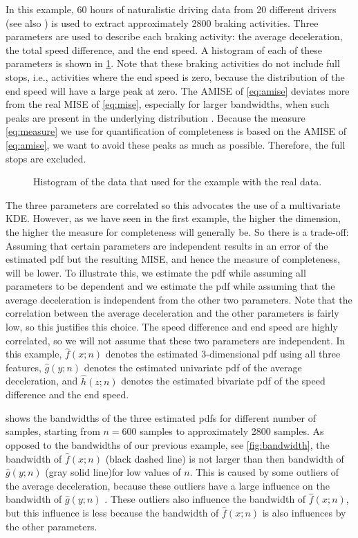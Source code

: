 In this example, 60 hours of naturalistic driving data from 20 different drivers (see also \textcite{deGelder2017assessment}) is used to extract approximately 2800 braking activities. Three parameters are used to describe each braking activity: the average deceleration, the total speed difference, and the end speed. A histogram of each of these parameters is shown in \cref{fig:histogram}. Note that these braking activities do not include full stops, i.e., activities where the end speed is zero, because the distribution of the end speed will have a large peak at zero. The AMISE of \cref{eq:amise} deviates more from the real MISE of \cref{eq:mise}, especially for larger bandwidths, when such peaks are present in the underlying distribution \cite{marron1992exact}. Because the measure \cref{eq:measure} we use for quantification of completeness is based on the AMISE of \cref{eq:amise}, we want to avoid these peaks as much as possible. Therefore, the full stops are excluded.

\setlength\figurewidth{\linewidth}
\setlength{}
\begin{figure}
	\centering
	
	\caption{Histogram of the data that used for the example with the real data.}
	\label{fig:histogram}
\end{figure}

The three parameters are correlated so this advocates the use of a multivariate KDE. However, as we have seen in the first example, the higher the dimension, the higher the measure for completeness will generally be. So there is a trade-off: Assuming that certain parameters are independent results in an error of the estimated pdf but the resulting MISE, and hence the measure of completeness, will be lower. To illustrate this, we estimate the pdf while assuming all parameters to be dependent and we estimate the pdf while assuming that the average deceleration is independent from the other two parameters. Note that the correlation between the average deceleration and the other parameters is fairly low, so this justifies this choice. The speed difference and end speed are highly correlated, so we will not assume that these two parameters are independent. In this example, $\hat{f}(x;n)$ denotes the estimated 3-dimensional pdf using all three features, $\hat{g}(y;n)$ denotes the estimated univariate pdf of the average deceleration, and $\hat{h}(z;n)$ denotes the estimated bivariate pdf of the speed difference and the end speed. 

 shows the bandwidths of the three estimated pdfs for different number of samples, starting from $n=600$ samples to approximately 2800 samples. As opposed to the bandwidths of our previous example, see \cref{fig:bandwidth}, the bandwidth of $\hat{f}(x;n)$ (black dashed line) is not larger than then bandwidth of $\hat{g}(y;n)$ (gray solid line)for low values of $n$. This is caused by some outliers of the average deceleration, because these outliers have a large influence on the bandwidth of $\hat{g}(y;n)$ \cite{hall1992global}. These outliers also influence the bandwidth of $\hat{f}(x;n)$, but this influence is less because the bandwidth of $\hat{f}(x;n)$ is also influences by the other parameters.

